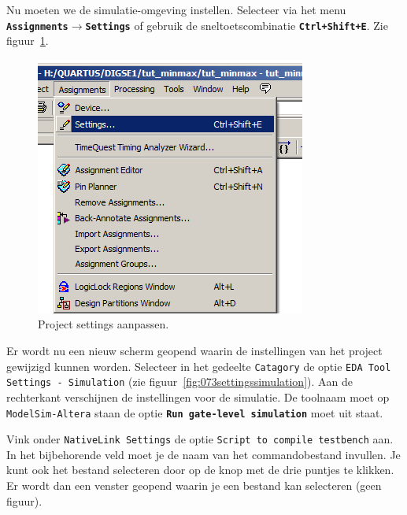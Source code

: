 \documentclass[a4paper,12pt,fleqn,twoside]{book}
\def\tutpicscale{0.455}
\newcommand{\menu}[1]{\texttt{\textbf{#1}}}
\newcommand{\naam}[1]{\texttt{#1}}
\def\pijl{$\rightarrow$}%
\begin{document}
Nu moeten we de simulatie-omgeving instellen. Selecteer via het menu 
\menu{Assignments\pijl{}Settings} of gebruik de sneltoetscombinatie
\menu{Ctrl+Shift+E}. Zie figuur~\ref{fig:074assignmentssettings}.

\begin{figure}[H]
\centering
\includegraphics[scale=\tutpicscale]{074assignmentssettings.png}
\caption{Project settings aanpassen.}
\label{fig:074assignmentssettings}
\end{figure} 

Er wordt nu een nieuw scherm geopend waarin de instellingen van het project
gewijzigd kunnen worden. Selecteer in het gedeelte \naam{Catagory} de optie
\naam{EDA Tool Settings - Simulation} (zie
figuur~\ref{fig:073settingssimulation}). Aan de rechterkant verschijnen de
instellingen voor de simulatie. De toolnaam moet op \naam{ModelSim-Altera}
staan de optie \menu{Run gate-level simulation} moet uit staat.

Vink onder \naam{NativeLink Settings} de optie \naam{Script to compile
testbench} aan. In het bijbehorende veld moet je de naam van het commandobestand
invullen. Je kunt ook het bestand selecteren door op de knop met de drie
puntjes te klikken. Er wordt dan een venster geopend waarin je een bestand kan
selecteren (geen figuur).
\end{document}
